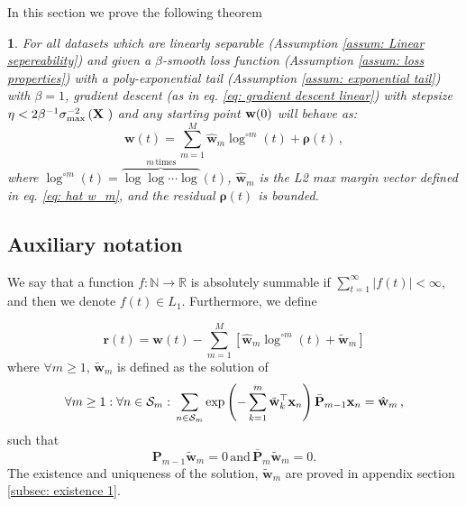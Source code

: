 \documentclass[twoside,11pt,english]{article}
\newtheorem{thm}{\protect\theoremname}
\providecommand{\theoremname}{Theorem}
\providecommand{\theoremname}{Theorem}
\begin{document}
{In this section we prove the following theorem
\begin{thm}
\label{theorem: main2}For all datasets which are linearly
separable (Assumption \ref{assum: Linear sepereability}) and given
a $\beta$-smooth loss function (Assumption \ref{assum: loss properties})
with a poly-exponential tail (Assumption \ref{assum: exponential tail})
with $\beta=1$, gradient descent (as in eq. \ref{eq: gradient descent linear})
with stepsize $\eta<2\beta^{-1}\sigma_{\max}^{-2}\left(\text{\ensuremath{\mathbf{X}} }\right)$
and any starting point $\mathbf{w}(0)$ will behave as: 
\begin{equation}
\mathbf{w}\left(t\right)=\sum_{m=1}^{M}\hat{\mathbf{w}}_{m}\log^{\circ m}\left(t\right)+\boldsymbol{\rho}\left(t\right)\,,\label{eq: asymptotic form-1}
\end{equation}
where $\log^{\circ m}\left(t\right)=\overbrace{\log\log\cdots\log}^{m\,\mathrm{times}}\left(t\right)$,
$\hat{\mathbf{w}}_{m}$ is the L2 max margin vector defined in eq.
\ref{eq: hat w_m}, and the residual $\boldsymbol{\rho}\left(t\right)$
is bounded. 
\end{thm}


\subsection{Auxiliary notation}

We say that a function $f:\mathbb{N}\rightarrow\mathbb{R}$ is absolutely
summable if $\sum_{t=1}^{\infty}\left|f\left(t\right)\right|<\infty$,
and then we denote $f\left(t\right)\in L_{1}$. Furthermore, we define

\[
\mathbf{r}\left(t\right)=\mathbf{w}\left(t\right)-\sum_{m=1}^{M}\left[\hat{\mathbf{w}}_{m}\log^{\circ m}\left(t\right)+\tilde{\mathbf{w}}_{m}\right]
\]
where  $\forall m\geq1$, $\tilde{\mathbf{w}}_{m}$ is defined as the solution
of 
\begin{equation}
\forall m\geq1:\forall n\in\mathcal{S}_{m}:\,\sum_{n\in\mathcal{S}_{m}}\exp\left(-\sum_{k=1}^{m}\tilde{\mathbf{w}}_{k}^{\top}\mathbf{x}_{n}\right)\bar{\mathbf{P}}_{m-1}\mathbf{x}_{n}=\hat{\mathbf{w}}_{m}\,,\label{eq: w tilde-1}
\end{equation}
such that 
\begin{equation}
\mathbf{P}_{m-1}\tilde{\mathbf{w}}_{m}=0\,\mathrm{and}\,\bar{\mathbf{P}}_{m}\tilde{\mathbf{w}}_{m}=0.\label{eq: w tilde constraints}
\end{equation}
The existence and uniqueness of the solution, $\tilde{\mathbf{w}}_{m}$
are proved in appendix section \ref{subsec: existence 1}.

}
\end{document}
